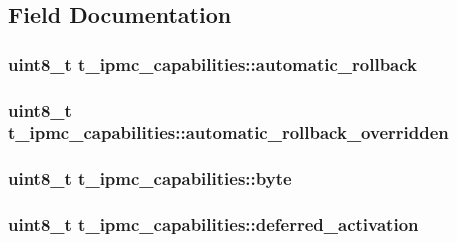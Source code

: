 \subsection{Field Documentation}
\hypertarget{uniont__ipmc__capabilities_a1a45b4b1a3f39a7cbb276c30d9b1f696}{
\subsubsection[{automatic\-\_\-rollback}]{\setlength{\rightskip}{0pt plus 5cm}uint8\-\_\-t t\-\_\-ipmc\-\_\-capabilities\-::automatic\-\_\-rollback}}\label{uniont__ipmc__capabilities_a1a45b4b1a3f39a7cbb276c30d9b1f696}
\hypertarget{uniont__ipmc__capabilities_a314b2e1d383b8a362585bb7a74b448fd}{
\subsubsection[{automatic\-\_\-rollback\-\_\-overridden}]{\setlength{\rightskip}{0pt plus 5cm}uint8\-\_\-t t\-\_\-ipmc\-\_\-capabilities\-::automatic\-\_\-rollback\-\_\-overridden}}\label{uniont__ipmc__capabilities_a314b2e1d383b8a362585bb7a74b448fd}
\hypertarget{uniont__ipmc__capabilities_a235c019c9d960f72a9b21610333a13e8}{
\subsubsection[{byte}]{\setlength{\rightskip}{0pt plus 5cm}uint8\-\_\-t t\-\_\-ipmc\-\_\-capabilities\-::byte}}\label{uniont__ipmc__capabilities_a235c019c9d960f72a9b21610333a13e8}
\hypertarget{uniont__ipmc__capabilities_aeb8b4f846e6fe23a0da8f6733581ff7f}{
\subsubsection[{deferred\-\_\-activation}]{\setlength{\rightskip}{0pt plus 5cm}uint8\-\_\-t t\-\_\-ipmc\-\_\-capabilities\-::deferred\-\_\-activation}}\label{uniont__ipmc__capabilities_aeb8b4f846e6fe23a0da8f6733581ff7f}
